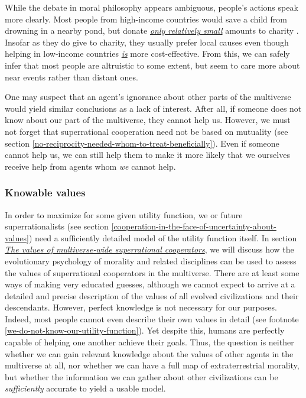 While the debate in moral philosophy appears ambiguous, people's actions
speak more clearly. Most people from high-income countries would save a
child from drowning in a nearby pond, but donate
\href{http://nccs.urban.org/nccs/statistics/charitable-giving-in-america-some-facts-and-figures.cfm}{\emph{only
relatively small}} amounts to charity
\parencite{Singer1972-uk}. Insofar as they do give to
charity, they usually prefer local causes even though helping in
low-income countries
\href{http://www.givewell.org/giving101/Your-dollar-goes-further-overseas}{\emph{is}}
more cost-effective. From this, we can safely infer that most people are
altruistic to some extent, but seem to care more about near events
rather than distant ones.

One may suspect that an agent's ignorance about other parts of the
multiverse would yield similar conclusions as a lack of interest. After
all, if someone does not know about our part of the multiverse, they
cannot help us. However, we must not forget that superrational
cooperation need not be based on mutuality (see section
\ref{no-reciprocity-needed-whom-to-treat-beneficially}). Even if someone
cannot help us, we can still help them to make it more likely that we
ourselves receive help from agents whom \emph{we} cannot help.

\subsubsection{Knowable values}\label{knowable-values}

In order to maximize for some given utility function, we or future
superrationalists (see section
\ref{cooperation-in-the-face-of-uncertainty-about-values}) need a
sufficiently detailed model of the utility function itself. In section
\protect\hyperlink{_sm02dccw7h9m}{\emph{The values of multiverse-wide
superrational cooperators}}, we will discuss how the evolutionary
psychology of morality and related disciplines can be used to assess the
values of superrational cooperators in the multiverse. There are at
least some ways of making very educated guesses, although we cannot
expect to arrive at a detailed and precise description of the values of
all evolved civilizations and their descendants. However, perfect
knowledge is not necessary for our purposes. Indeed, most people cannot
even describe their own values in detail (see footnote
\ref{we-do-not-know-our-utility-function}). Yet despite
this, humans are perfectly capable of helping one another achieve their
goals. Thus, the question is neither whether we can gain relevant
knowledge about the values of other agents in the multiverse at all, nor
whether we can have a full map of extraterrestrial morality, but whether
the information we can gather about other civilizations can be
\emph{sufficiently} accurate to yield a usable model.

